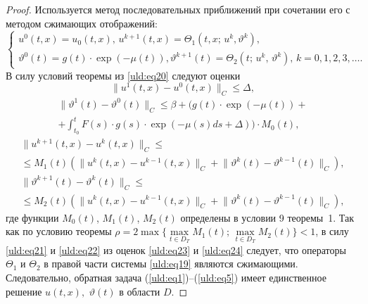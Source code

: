 \begin{proof}
Используется метод последовательных приближений при сочетании его с методом сжимающих отображений:
\begin{equation}
\label{uld:eq20}
\begin{cases}
u^0 (t, x)=u_0 (t, x),\,u^{ k+1} (t, x)=\Theta _1 (t , x ;\, u^k , \vartheta^k), 
\\
 \vartheta^0 (t )=g(t) \cdot \exp  \left( - \mu (t )\right) , \vartheta^{k+1} (t )=\Theta _2
(t ;\,u^k,\,\vartheta^k), \,k=0,1,2,3,\ldots.
\end{cases}
\end{equation}
В силу условий теоремы из \eqref{uld:eq20} следуют оценки
\begin{equation}
\label{uld:eq21}
\bigl\| u^1( t , x)-u^0( t , x)\bigr\|_C \le \Delta,
\end{equation}
\begin{multline}
\label{uld:eq22}
\bigl\| \vartheta^1( t)-\vartheta^0(t) \bigr\|_C \le
\beta + \biggl( g (t)\cdot \exp  \left( - \mu (t ) \right) + \\ + \int_{t_0}^t F (s)\cdot
g (s)\cdot \exp  (- \mu    (s ) d s+\Delta )\biggr)\cdot M_0 (t),
\end{multline}
\begin{multline}
\label{uld:eq23}
\bigl\| u^{k+1}( t , x)-u^k( t , x) \bigr\|_C \le \\ 
\le M_1 (t)  \left( \bigl\| u^k( t , x)-u^{k-1}( t , x) \bigr\|_C +  \bigl\|  \vartheta^k(
t)-\vartheta^{ k-1}( t) \bigr\|_C \right),
\end{multline}
\begin{multline}
\label{uld:eq24}
\bigl\| \vartheta^{ k+1}( t)-\vartheta^k( t) \bigr\|_C \le \\ 
\le M_2 (t)  \left( \bigl\| u^k( t , x)-u^{k-1}( t , x) \bigr\|_C + \bigl\| \vartheta^k(
t)-\vartheta^{ k-1}( t) \bigr\|_C \right),
\end{multline}
где функции $M_0(t)$, $M_1(t)$, $M_2(t)$ определены в условии 9 теоремы~1.
Так как по условию теоремы $\rho =2  \max  \bigl\{ \max\limits_{t\in D_T} M_1(t);\,\max\limits_{t\in D_T} M_2(t) \bigr\}<1$, в силу
\eqref{uld:eq21} и \eqref{uld:eq22} из оценок \eqref{uld:eq23} и \eqref{uld:eq24} следует, что операторы $\Theta _1$ и $\Theta _2$ в правой части системы \eqref{uld:eq19} являются сжимающими. Следовательно,
обратная задача (\ref{uld:eq1})--(\ref{uld:eq5}) имеет единственное решение $u (t, x),$ $\vartheta  (t) $ в области $D$.
\end{proof}

